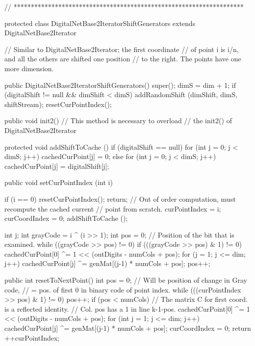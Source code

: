 \begin{code}\begin{hide}


   // *******************************************************************

   protected class DigitalNetBase2IteratorShiftGenerators 
                   extends DigitalNetBase2Iterator {
      // Similar to DigitalNetBase2Iterator; the first coordinate
      // of point i is i/n, and all the others are shifted one position
      // to the right. The points have one more dimension.

      public DigitalNetBase2IteratorShiftGenerators() {
         super(); 
         dimS = dim + 1;
         if (digitalShift != null && dimShift < dimS)
            addRandomShift (dimShift, dimS, shiftStream);
         resetCurPointIndex();
      }

      public void init2() {  // This method is necessary to overload
      }                      // the init2() of DigitalNetBase2Iterator

      protected void addShiftToCache () {
         if (digitalShift == null)
            for (int j = 0; j < dimS; j++)
               cachedCurPoint[j] = 0;
         else
            for (int j = 0; j < dimS; j++)
               cachedCurPoint[j] = digitalShift[j];
      }

      public void setCurPointIndex (int i) {
         if (i == 0) {
            resetCurPointIndex();   return;
         }
         // Out of order computation, must recompute the cached current
         // point from scratch.
         curPointIndex = i;  
         curCoordIndex = 0;
         addShiftToCache ();

         int j;
         int grayCode = i ^ (i >> 1);
         int pos = 0;      // Position of the bit that is examined.
         while ((grayCode >> pos) != 0) {
            if (((grayCode >> pos) & 1) != 0) {
               cachedCurPoint[0] ^= 1 << (outDigits - numCols + pos);
               for (j = 1; j <= dim; j++)
                  cachedCurPoint[j] ^= genMat[(j-1) * numCols + pos];
            }
            pos++;
         }
      }

      public int resetToNextPoint() {
         int pos = 0;  // Will be position of change in Gray code,
                       // = pos. of first 0 in binary code of point index.
         while (((curPointIndex >> pos) & 1) != 0)
            pos++;
         if (pos < numCols) {
            // The matrix C for first coord. is a reflected identity.
            // Col. pos has a 1 in line k-1-pos.
            cachedCurPoint[0] ^= 1 << (outDigits - numCols + pos);
            for (int j = 1; j <= dim; j++)
               cachedCurPoint[j] ^= genMat[(j-1) * numCols + pos];
         }
         curCoordIndex = 0;
         return ++curPointIndex;
      }

}
\end{hide}
\end{code}
